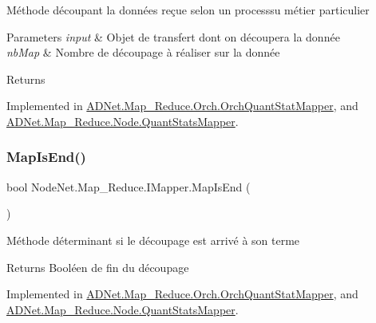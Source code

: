Méthode découpant la données reçue selon un processsu métier particulier 


\begin{DoxyParams}{Parameters}
{\em input} & Objet de transfert dont on découpera la donnée\\
\hline
{\em nb\+Map} & Nombre de découpage à réaliser sur la donnée\\
\hline
\end{DoxyParams}
\begin{DoxyReturn}{Returns}

\end{DoxyReturn}


Implemented in \hyperlink{class_a_d_net_1_1_map___reduce_1_1_orch_1_1_orch_quant_stat_mapper_a0e13cf0b99158b111ccb3d712435d4f1}{A\+D\+Net.\+Map\+\_\+\+Reduce.\+Orch.\+Orch\+Quant\+Stat\+Mapper}, and \hyperlink{class_a_d_net_1_1_map___reduce_1_1_node_1_1_quant_stats_mapper_a79e61ac8815e19005f446efd5abec94c}{A\+D\+Net.\+Map\+\_\+\+Reduce.\+Node.\+Quant\+Stats\+Mapper}.

\mbox{\label{interface_node_net_1_1_map___reduce_1_1_i_mapper_a0d6d2bd1a8081efa0d6df109af9c4ec1}} 
\subsubsection{\texorpdfstring{Map\+Is\+End()}{MapIsEnd()}}
{\footnotesize\ttfamily bool Node\+Net.\+Map\+\_\+\+Reduce.\+I\+Mapper.\+Map\+Is\+End (\begin{DoxyParamCaption}{ }\end{DoxyParamCaption})}



Méthode déterminant si le découpage est arrivé à son terme 

\begin{DoxyReturn}{Returns}
Booléen de fin du découpage
\end{DoxyReturn}


Implemented in \hyperlink{class_a_d_net_1_1_map___reduce_1_1_orch_1_1_orch_quant_stat_mapper_a89d51140c9afd79b450619a41974d0b0}{A\+D\+Net.\+Map\+\_\+\+Reduce.\+Orch.\+Orch\+Quant\+Stat\+Mapper}, and \hyperlink{class_a_d_net_1_1_map___reduce_1_1_node_1_1_quant_stats_mapper_aca541c507e21824ff679f62be55aeab4}{A\+D\+Net.\+Map\+\_\+\+Reduce.\+Node.\+Quant\+Stats\+Mapper}.

